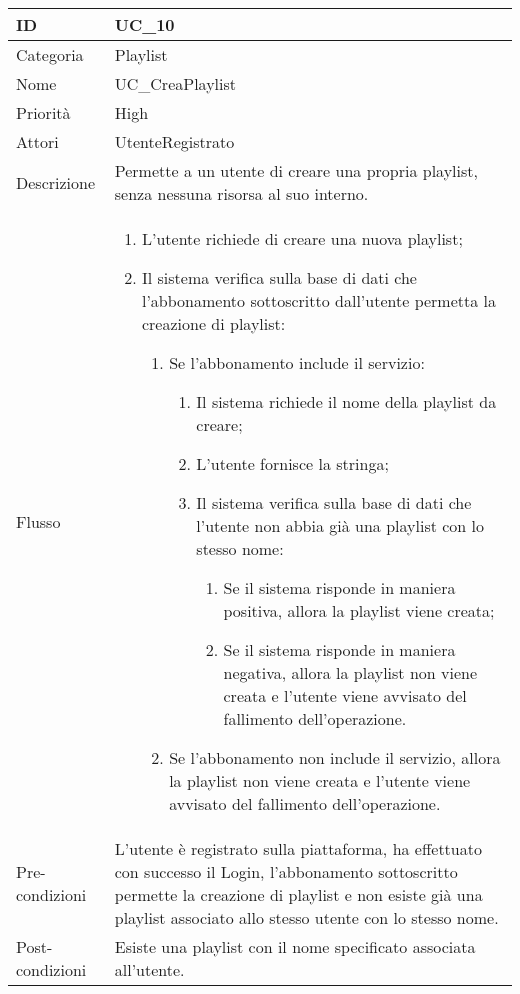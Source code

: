 \begin{center}
\begin{tabular}{ |p{2cm}|p{13cm}|  }
\hline
ID & UC\_10 \\\hline
Categoria & Playlist\\\hline
Nome & UC\_CreaPlaylist\\\hline
Priorità & High \\\hline
Attori &  UtenteRegistrato \\\hline
Descrizione & Permette a un utente di creare una propria playlist, senza nessuna risorsa al suo interno.\\\hline
Flusso &  	\begin{enumerate}
			\item L'utente richiede di creare una nuova playlist;
			\item Il sistema verifica sulla base di dati che l'abbonamento sottoscritto dall'utente permetta la creazione di playlist:
			\begin{enumerate}
				\item Se l'abbonamento include il servizio:
				\begin{enumerate}
					\item Il sistema richiede il nome della playlist da creare;
					\item L'utente fornisce la stringa;
					\item Il sistema verifica sulla base di dati che l'utente non abbia già una playlist con lo stesso nome:
					\begin{enumerate}
						\item Se il sistema risponde in maniera positiva, allora la playlist viene creata;
						\item Se il sistema risponde in maniera negativa, allora la playlist non viene creata e l'utente viene avvisato del fallimento dell'operazione.
					\end{enumerate}
				\end{enumerate}
				\item Se l'abbonamento non include il servizio, allora la playlist non viene creata e l'utente viene avvisato del fallimento dell'operazione.
			\end{enumerate}
		\end{enumerate}\\\hline
Pre-condizioni & L'utente è registrato sulla piattaforma, ha effettuato con successo il Login,  l'abbonamento sottoscritto permette la creazione di playlist e non esiste già una playlist associato allo stesso utente con lo stesso nome.\\\hline
Post-condizioni & Esiste una playlist con il nome specificato associata all'utente.\\\hline
\end{tabular}
\label{table_use_case:10}\newline


\end{center}
